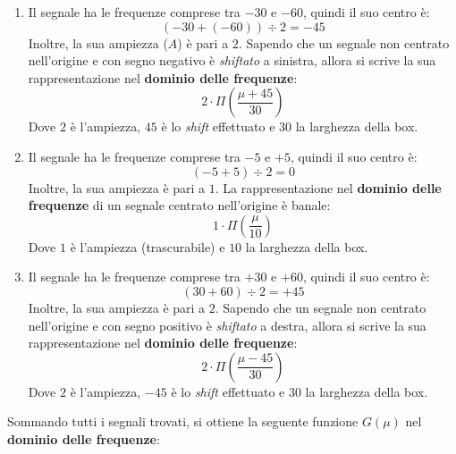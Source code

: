 \documentclass[a4paper]{article}
\begin{document}
	\begin{enumerate}[label=\alph*)]
		\item Il segnale ha le frequenze comprese tra $-30$ e $-60$, quindi il suo centro è:
		\begin{equation*}
			\left(-30 + \left(-60\right)\right) \div 2 = -45
		\end{equation*}
		Inoltre, la sua ampiezza ($A$) è pari a $2$.\newline
		Sapendo che un segnale non centrato nell'origine e con segno negativo è \emph{shiftato} a sinistra, allora si scrive la sua rappresentazione nel \textbf{dominio delle frequenze}:
		\begin{equation*}
			2 \cdot \Pi\left(\dfrac{\mu + 45}{30}\right)
		\end{equation*}
		Dove $2$ è l'ampiezza, $45$ è lo \emph{shift} effettuato e $30$ la larghezza della box.
		
		\item Il segnale ha le frequenze comprese tra $-5$ e $+5$, quindi il suo centro è:
		\begin{equation*}
			\left(-5 + 5\right) \div 2 = 0
		\end{equation*}
		Inoltre, la sua ampiezza è pari a $1$.\newline
		La rappresentazione nel \textbf{dominio delle frequenze} di un segnale centrato nell'origine è banale:
		\begin{equation*}
			1 \cdot \Pi\left(\dfrac{\mu}{10}\right)
		\end{equation*}
		Dove $1$ è l'ampiezza (trascurabile) e $10$ la larghezza della box.\newpage
		
		\item Il segnale ha le frequenze comprese tra $+30$ e $+60$, quindi il suo centro è:
		\begin{equation*}
			\left(30 + 60\right) \div 2 = +45
		\end{equation*}
		Inoltre, la sua ampiezza è pari a $2$.\newline
		Sapendo che un segnale non centrato nell'origine e con segno positivo è \emph{shiftato} a destra, allora si scrive la sua rappresentazione nel \textbf{dominio delle frequenze}:
		\begin{equation*}
			2 \cdot \Pi\left(\dfrac{\mu - 45}{30}\right)
		\end{equation*}
		Dove $2$ è l'ampiezza, $- 45$ è lo \emph{shift} effettuato e $30$ la larghezza della box.
	\end{enumerate}
	Sommando tutti i segnali trovati, si ottiene la seguente funzione $G\left(\mu\right)$ nel \textbf{dominio delle frequenze}:
\end{document}
